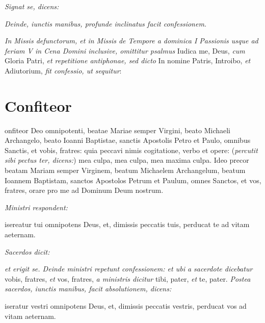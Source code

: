 
\textit{Signat se, dicens:}


\textit{Deinde, iunctis manibus, profunde inclinatus facit confessionem.}

\divisio

\textit{In Missis defunctorum, et in Missis de Tempore a dominica I Passionis
usque ad feriam V in Cena Domini inclusive, omittitur psalmus} Iudica me, Deus,
\textit{cum} Gloria Patri, \textit{et repetitione antiphonae, sed dicto} In
nomine Patris, Introibo, \textit{et} Adiutorium, \textit{fit confessio, ut
sequitur}:

\divisio

\section{Confiteor}

onfiteor Deo omnipotenti, beatae Mariae semper Virgini, beato
Michaeli Archangelo, beato Ioanni Baptistae, sanctis Apostolis Petro et Paulo,
omnibus Sanctis, et vobis, fratres: quia peccavi nimis cogitatione, verbo et
opere: (\textit{percutit sibi pectus ter, dicens:}) mea culpa, mea culpa, mea
maxima culpa.  Ideo precor beatam Mariam semper Virginem, beatum Michaelem
Archangelum, beatum Ioannem Baptistam, sanctos Apostolos Petrum et Paulum, omnes
Sanctos, et vos, fratres, orare pro me ad Dominum Deum nostrum.

\textit{Ministri respondent:}

isereatur tui omnipotens Deus, et, dimissis peccatis tuis, perducat
te ad vitam aeternam.

\textit{Sacerdos dicit:}


\textit{et erigit se.  Deinde ministri repetunt confessionem: et ubi a sacerdote
dicebatur} vobis, fratres, \textit{et} vos, fratres, \textit{a ministris
dicitur} tibi, pater, \textit{et} te, pater.  \textit{Postea sacerdos, iunctis
manibus, facit absolutionem, dicens:}

iseratur vestri omnipotens Deus, et, dimissis peccatis vestris,
perducat vos ad vitam aeternam.

